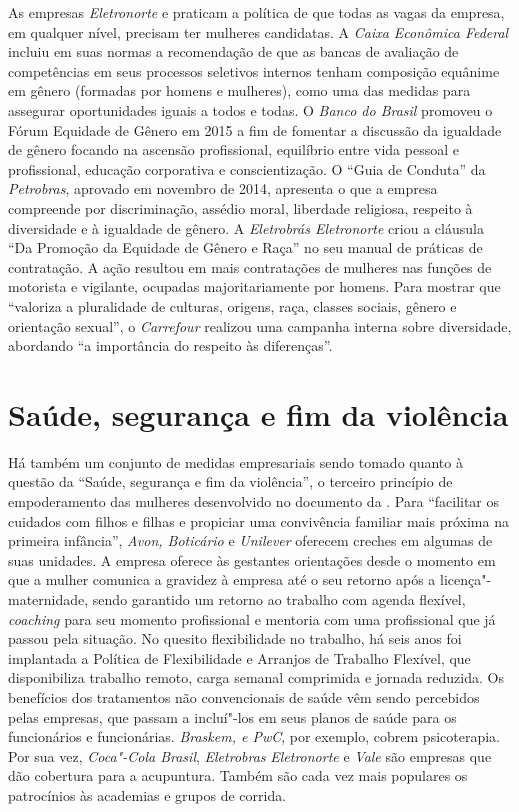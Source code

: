 As empresas \emph{Eletronorte} e \emph{} praticam a política de que
todas as vagas da empresa, em qualquer nível, precisam ter mulheres
candidatas. A \emph{Caixa Econômica Federal} incluiu em suas normas a
recomendação de que as bancas de avaliação de competências em seus
processos seletivos internos tenham composição equânime em gênero
(formadas por homens e mulheres), como uma das medidas para assegurar
oportunidades iguais a todos e todas. O \emph{Banco do Brasil} promoveu
o Fórum Equidade de Gênero em 2015 a fim de fomentar a discussão da
igualdade de gênero focando na ascensão profissional, equilíbrio entre
vida pessoal e profissional, educação corporativa e conscientização. O
``Guia de Conduta'' da \emph{Petrobras}, aprovado em novembro de 2014,
apresenta o que a empresa compreende por discriminação, assédio moral,
liberdade religiosa, respeito à diversidade e à igualdade de gênero. A
\emph{Eletrobrás Eletronorte} criou a cláusula ``Da Promoção da Equidade
de Gênero e Raça'' no seu manual de práticas de contratação. A ação
resultou em mais contratações de mulheres nas funções de motorista e
vigilante, ocupadas majoritariamente por homens. Para mostrar que
``valoriza a pluralidade de culturas, origens, raça, classes sociais,
gênero e orientação sexual'', o \emph{Carrefour} realizou uma campanha
interna sobre diversidade, abordando ``a importância do respeito às
diferenças''.

\section{Saúde, segurança e fim da violência}

Há também um conjunto de medidas empresariais sendo tomado quanto à
questão da ``Saúde, segurança e fim da violência'', o terceiro princípio
de empoderamento das mulheres desenvolvido no documento da . Para
``facilitar os cuidados com filhos e filhas e propiciar uma convivência
familiar mais próxima na primeira infância'', \emph{Avon, Boticário} e
\emph{Unilever} oferecem creches em algumas de suas unidades. A empresa
 oferece às gestantes orientações desde o momento em que a mulher
comunica a gravidez à empresa até o seu retorno após a
licença"-maternidade, sendo garantido um retorno ao trabalho com agenda
flexível, \emph{coaching} para seu momento profissional
e mentoria com uma profissional que já passou pela situação. No quesito
flexibilidade no trabalho, há seis anos foi implantada a Política de
Flexibilidade e Arranjos de Trabalho Flexível, que disponibiliza
trabalho remoto, carga semanal comprimida e jornada reduzida. Os
benefícios dos tratamentos não convencionais de saúde vêm sendo
percebidos pelas empresas, que passam a incluí"-los em seus planos de
saúde para os funcionários e funcionárias. \emph{Braskem,  e PwC},
por exemplo, cobrem psicoterapia. Por sua vez, \emph{Coca"-Cola Brasil},
\emph{Eletrobras} \emph{Eletronorte} e \emph{Vale} são empresas que dão
cobertura para a acupuntura. Também são cada vez mais populares os
patrocínios às academias e grupos de corrida.

